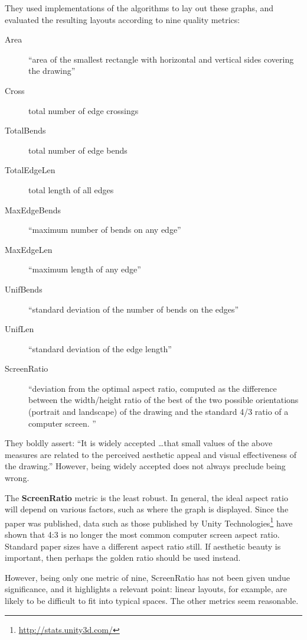 They used implementations of the algorithms to lay out these graphs, and evaluated the resulting layouts according to nine quality metrics:

\begin{description}
    \item[Area]
``area of the smallest rectangle with horizontal and vertical sides covering the drawing''
    \item[Cross]
total number of edge crossings
    \item[TotalBends]
total number of edge bends
    \item[TotalEdgeLen]
total length of all edges
    \item[MaxEdgeBends]
``maximum number of bends on any edge''
    \item[MaxEdgeLen]
``maximum length of any edge''
    \item[UnifBends]
``standard deviation of the number of bends on the edges''
    \item[UnifLen]
``standard deviation of the edge length''
    \item[ScreenRatio]
``deviation from the optimal aspect ratio, computed as the difference between the width/height ratio of the best of the two possible orientations (portrait and landscape) of the drawing and the standard 4/3 ratio of a computer screen. ''
\end{description}

They boldly assert: ``It is widely accepted \ldots that small values of the above measures are related to the perceived aesthetic appeal and visual effectiveness of the drawing.''
However, being widely accepted does not always preclude being wrong.

The \textbf{ScreenRatio} metric is the least robust.
In general, the ideal aspect ratio will depend on various factors, such as where the graph is displayed.
Since the paper was published, data such as those published by Unity Technologies\footnote{\url{http://stats.unity3d.com/}} have shown that 4:3 is no longer the most common computer screen aspect ratio.
Standard paper sizes have a different aspect ratio still.
If aesthetic beauty is important, then perhaps the golden ratio \cite{Harrington:2004:AMA:1030397.1030419} should be used instead.

However, being only one metric of nine, ScreenRatio has not been given undue significance, and it highlights a relevant point: linear layouts, for example, are likely to be difficult to fit into typical spaces.
The other metrics seem reasonable.


